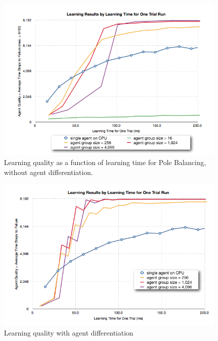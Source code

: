 \begin{figure}[hbtp]
\center
\includegraphics[scale=0.35]{fig08a}
\caption{Learning quality as a function of learning time for Pole Balancing, without agent differentiation.}
\label{fig:pole_time}
\end{figure}

\begin{figure}[hbtp]
\center
\includegraphics[scale=0.35]{fig10a}
\caption{Learning quality with agent differentiation}
\label{fig:pole_timediff}
\end{figure}


